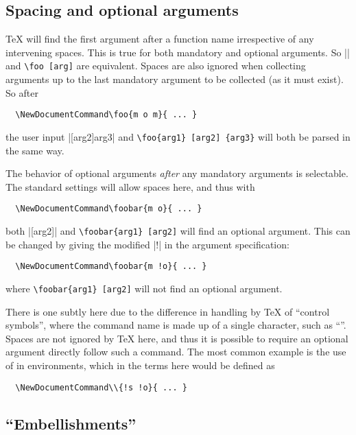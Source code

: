\documentclass{l3doc}
\begin{document}
\subsection{Spacing and optional arguments}
\label{sec:cmd:opt-space}

\TeX{} will find the first argument after a function name irrespective of any
intervening spaces. This is true for both mandatory and optional arguments. So
|\foo[arg]| and \verb*|\foo [arg]| are equivalent. Spaces are also ignored when
collecting arguments up to the last mandatory argument to be collected (as it
must exist). So after
\begin{verbatim}
  \NewDocumentCommand\foo{m o m}{ ... }
\end{verbatim}
the user input |[arg2]{arg3}| and \verb*|\foo{arg1} [arg2] {arg3}|
will both be parsed in the same way.
 
The behavior of optional arguments \emph{after} any mandatory arguments is
selectable. The standard settings will allow spaces here, and thus with
\begin{verbatim}
  \NewDocumentCommand\foobar{m o}{ ... }
\end{verbatim}
both |[arg2]| and \verb*|\foobar{arg1} [arg2]| will find an
optional argument. This can be changed by giving the modified |!| in the
argument specification:
\begin{verbatim}
  \NewDocumentCommand\foobar{m !o}{ ... }
\end{verbatim}
where \verb*|\foobar{arg1} [arg2]| will not find an optional argument.

There is one subtly here due to the difference in handling by \TeX{} of
\enquote{control symbols}, where the command name is made up of a single
character, such as \enquote{\cmd{\\}}. Spaces are not ignored by \TeX{} here,
and thus it is possible to require an optional argument directly follow such a
command. The most common example is the use of \cmd{\\} in 
environments, which in the terms here would be defined as
\begin{verbatim}
  \NewDocumentCommand\\{!s !o}{ ... }
\end{verbatim}

\subsection{\enquote{Embellishments}}
\label{sec:cmd:embellishment}
\end{document}
